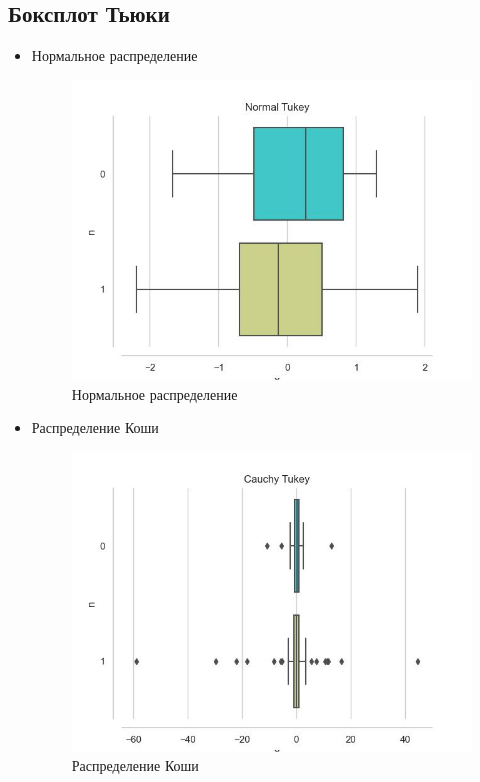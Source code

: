 \subsection{Боксплот Тьюки}
\begin{itemize}
	\item{Нормальное распределение}
	\begin{figure}[H]
		\begin{center}
			\includegraphics[scale=0.75]{task_3/resource/Normal Tukey.jpg}
			\caption{Нормальное распределение} 
		\end{center}
	\end{figure}
	
	\item{Распределение Коши}
	\begin{figure}[H]
		\begin{center}
			\includegraphics[scale=0.75]{task_3/resource/cauchy Tukey.jpg}
			\caption{Распределение Коши}
		\end{center}
	\end{figure}
		

\end{itemize}
